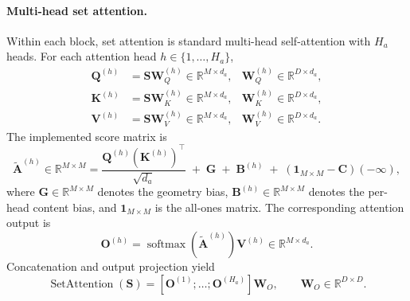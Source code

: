 \documentclass{article}
\theoremstyle{plain}
\theoremstyle{definition}
\theoremstyle{remark}
\begin{document}
\paragraph{Multi-head set attention.}
Within each block, set attention is standard multi-head self-attention with $H_a$ heads. For each attention head $h\in\{1,\dots,H_a\}$,
\begin{align}
\label{eq:qkv-projections}
\mathbf Q^{(h)} &= \mathbf S\mathbf W_Q^{(h)} \in \mathbb R^{M\times d_a},
&\mathbf W_Q^{(h)}\in\mathbb R^{D\times d_a},\\
\mathbf K^{(h)} &= \mathbf S\mathbf W_K^{(h)} \in \mathbb R^{M\times d_a},
&\mathbf W_K^{(h)}\in\mathbb R^{D\times d_a},\\
\mathbf V^{(h)} &= \mathbf S\mathbf W_V^{(h)} \in \mathbb R^{M\times d_a},
&\mathbf W_V^{(h)}\in\mathbb R^{D\times d_a}.
\end{align}
The implemented score matrix is
\begin{equation}
\label{eq:attention-scores}
\widetilde{\mathbf A}^{(h)} \in \mathbb R^{M\times M}
=
\frac{\mathbf Q^{(h)}(\mathbf K^{(h)})^\top}{\sqrt{d_a}}
\;+\;\mathbf G
\;+\;\mathbf B^{(h)}
\;+\;(\mathbf 1_{M\times M}-\mathbf C)(-\infty),
\end{equation}
where $\mathbf G\in\mathbb R^{M\times M}$ denotes the geometry bias, $\mathbf
B^{(h)}\in\mathbb R^{M\times M}$ denotes the per-head content bias, and
$\mathbf 1_{M\times M}$ is the all-ones matrix. The corresponding attention
output is
\begin{equation}
\label{eq:attention-output}
\mathbf O^{(h)}=\operatorname{softmax}(\widetilde{\mathbf A}^{(h)})\mathbf V^{(h)}
\in \mathbb R^{M\times d_a}.
\end{equation}
Concatenation and output projection yield
\begin{equation}
\label{eq:multihead-concat}
\operatorname{SetAttention}(\mathbf S)
=
[\mathbf O^{(1)};\dots;\mathbf O^{(H_a)}]\mathbf W_O,
\qquad
\mathbf W_O\in\mathbb R^{D\times D}.
\end{equation}
\end{document}
